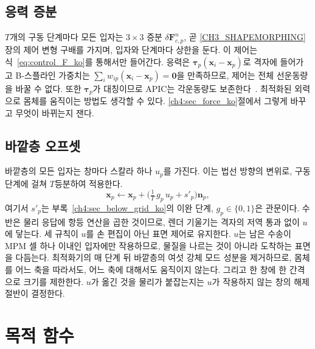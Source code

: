 \subsection{응력 증분}
$T$개의 구동 단계마다 모든 입자는 $3\times3$ 증분 $\delta\mathbf{F}^{n}_{c,p}$, 곧 \ref{CH3_SHAPEMORPHING}장의 제어 변형
구배를 가지며, 입자와 단계마다 상한을 둔다. 이 제어는 식~\eqref{eq:control_F_ko}를 통해서만 들어간다. 응력은
$\boldsymbol{\tau}_p(\mathbf{x}_i-\mathbf{x}_p)$로 격자에 들어가고 B-스플라인 가중치는
$\sum_i w_{ip}(\mathbf{x}_i-\mathbf{x}_p)=\mathbf{0}$을 만족하므로, 제어는 전체 선운동량을 바꿀 수 없다. 또한
$\boldsymbol{\tau}_p$가 대칭이므로 APIC는 각운동량도 보존한다~\citep{jiang2016material}. 최적화된 외력으로 몸체를 움직이는
방법도 생각할 수 있다. \ref{ch4:sec_force_ko}절에서 그렇게 바꾸고 무엇이 바뀌는지 잰다.

\subsection{바깥층 오프셋}
바깥층의 모든 입자는 창마다 스칼라 하나 $u_p$를 가진다. 이는 법선 방향의 변위로, 구동 단계에 걸쳐 $T$등분하여 적용한다.
\begin{equation}
\label{ch4:eq_u_ko}
\mathbf{x}_p\leftarrow\mathbf{x}_p+\Big(\tfrac{1}{T}\,g_p\,u_p+s'_p\Big)\mathbf{n}_p ,
\end{equation}
여기서 $s'_p$는 부록~\ref{ch4:sec_below_grid_ko}의 이완 단계, $g_p\in\{0,1\}$은 관문이다. 수반은 물리 응답에 항등 연산을
곱한 것이므로, 렌더 기울기는 격자의 저역 통과 없이 $u$에 닿는다. 세 규칙이 $u$를 손 편집이 아닌 표면 제어로 유지한다. $u$는
남은 수송이 MPM 셀 하나 이내인 입자에만 작용하므로, 물질을 나르는 것이 아니라 도착하는 표면을 다듬는다. 최적화기의 매 단계
뒤 바깥층의 여섯 강체 모드 성분을 제거하므로, 몸체를 어느 축을 따라서도, 어느 축에 대해서도 움직이지 않는다. 그리고 한
창에 한 간격으로 크기를 제한한다. $u$가 옮긴 것을 물리가 붙잡는지는 $u$가 작용하지 않는 창의 해제 절반이 결정한다.

\section{목적 함수}
\label{ch4:sec_objective_ko}

